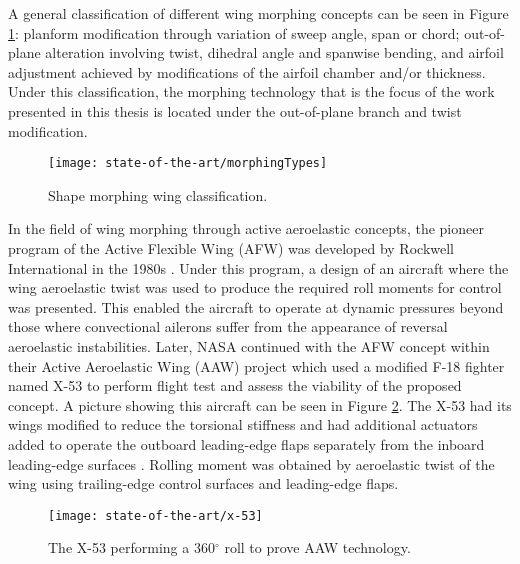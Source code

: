  A general classification of different wing morphing concepts can be seen in Figure \ref{fig:morphingTypes}: planform modification through variation of sweep angle, span or chord; out-of-plane alteration involving twist, dihedral angle and spanwise bending, and airfoil adjustment achieved by modifications of the airfoil chamber and/or thickness. Under this classification, the morphing technology that is the focus of the work presented in this thesis is located under the out-of-plane branch and twist modification.

  \begin{figure}[!htpb]
    \centering
    \texttt{[image: state-of-the-art/morphingTypes]}
    \caption[Shape morphing wing classification]{Shape morphing wing classification. \cite{Barbarino2011}}\label{fig:morphingTypes}
  \end{figure}

  In the field of wing morphing through active aeroelastic concepts, the pioneer program of the Active Flexible Wing (AFW) was developed by Rockwell International in the 1980s \cite{Rockwell}. Under this program, a design of an aircraft where the wing aeroelastic twist was used to produce the required roll moments for control was presented. This enabled the aircraft to operate at dynamic pressures beyond those where convectional ailerons suffer from the appearance of reversal aeroelastic instabilities. Later, NASA continued with the AFW concept within their Active Aeroelastic Wing (AAW) project which used a modified F-18 fighter named X-53 to perform flight test and assess the viability of the proposed concept. A picture showing this aircraft can be seen in Figure \ref{fig:x-53}. The X-53 had its wings modified to reduce the torsional stiffness and had additional actuators added to operate the outboard leading-edge flaps separately from the inboard leading-edge surfaces \cite{NASA}. Rolling moment was obtained by aeroelastic twist of the wing using trailing-edge control surfaces and leading-edge flaps.

  \begin{figure}[!htpb]
    \centering
    \texttt{[image: state-of-the-art/x-53]}
    \caption[The X-53 performing a 360$^{\circ}$ roll to prove AAW technology]{The X-53 performing a 360$^{\circ}$ roll to prove AAW technology. \cite{NASA}}\label{fig:x-53}
  \end{figure}

